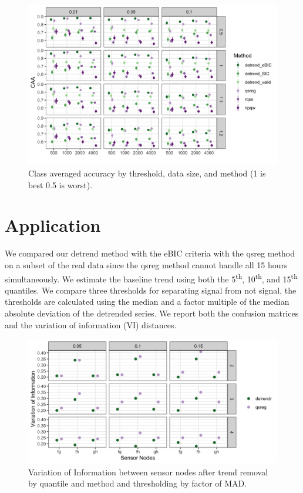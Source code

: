 \documentclass[12pt]{article}
\begin{document}
	\begin{figure}[h!]
		\caption{Class averaged accuracy by threshold, data size, and method (1 is best 0.5 is worst).}
		\includegraphics[width = \linewidth]{Figures/peaks_CAA.png}
	\end{figure}


	\FloatBarrier
	
	\section{Application}
	
	We compared our detrend method with the eBIC criteria with the qsreg method on a subset of the real data since the qsreg method cannot handle all 15 hours simultaneously. We estimate the baseline trend using both the 5\textsuperscript{th}, 10\textsuperscript{th}, and 15\textsuperscript{th} quantiles. We compare three thresholds for separating signal from not signal, the thresholds are calculated using the median and a factor multiple of the median absolute deviation of the detrended series. We report both the confusion matrices and the variation of information (VI) distances. 
	

	
		\begin{figure}
		\centering
		\caption{Variation of Information between sensor nodes after trend removal by quantile and method and thresholding by factor of MAD.}
		\includegraphics[width = .9\linewidth]{Figures/VI_app_short.png}
	\end{figure}
	
\end{document}
